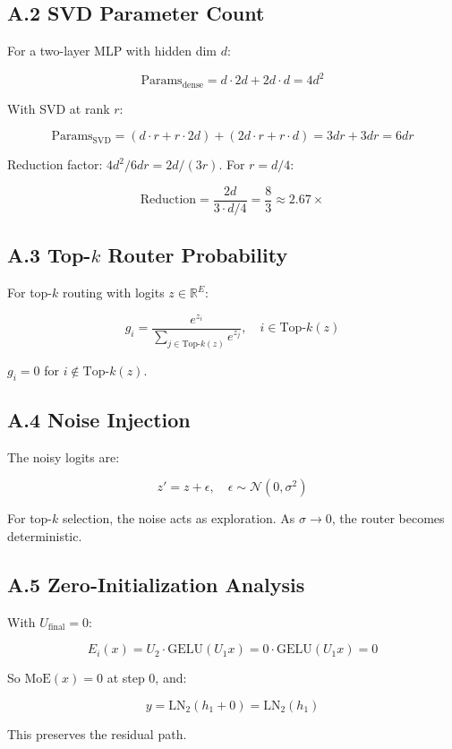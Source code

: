 \subsection{A.2 SVD Parameter Count}

For a two-layer MLP with hidden dim $d$:

\[
\text{Params}_\text{dense} = d \cdot 2d + 2d \cdot d = 4d^2
\]

With SVD at rank $r$:

\[
\text{Params}_\text{SVD} = (d \cdot r + r \cdot 2d) + (2d \cdot r + r \cdot d) = 3dr + 3dr = 6dr
\]

Reduction factor: $4d^2 / 6dr = 2d / (3r)$. For $r = d/4$:

\[
\text{Reduction} = \frac{2d}{3 \cdot d/4} = \frac{8}{3} \approx 2.67\times
\]

\subsection{A.3 Top-$k$ Router Probability}

For top-$k$ routing with logits $z \in \mathbb{R}^E$:

\[
g_i = \frac{e^{z_i}}{\sum_{j \in \text{Top-}k(z)} e^{z_j}}, \quad i \in \text{Top-}k(z)
\]

$g_i = 0$ for $i \notin \text{Top-}k(z)$.

\subsection{A.4 Noise Injection}

The noisy logits are:

\[
z' = z + \epsilon, \quad \epsilon \sim \mathcal{N}(0, \sigma^2)
\]

For top-$k$ selection, the noise acts as exploration. As $\sigma \to 0$, 
the router becomes deterministic.

\subsection{A.5 Zero-Initialization Analysis}

With $U_\text{final} = 0$:

\[
E_i(x) = U_2 \cdot \text{GELU}(U_1 x) = 0 \cdot \text{GELU}(U_1 x) = 0
\]

So $\text{MoE}(x) = 0$ at step 0, and:

\[
y = \text{LN}_2(h_1 + 0) = \text{LN}_2(h_1)
\]

This preserves the residual path.

